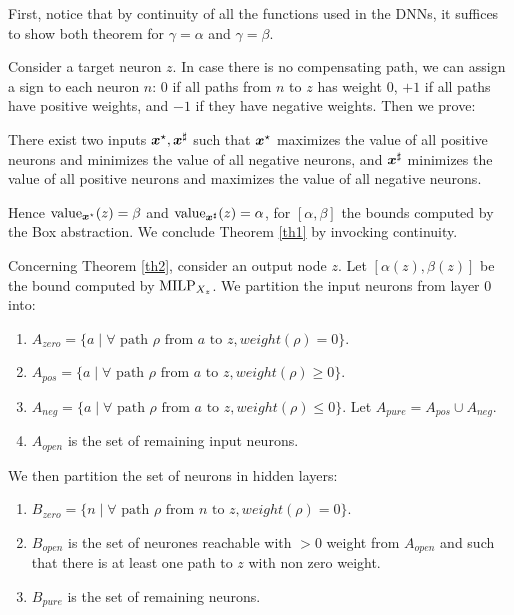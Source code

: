 First, notice that by continuity of all the functions used in the DNNs, it suffices to show both theorem for $\gamma=\alpha$ and $\gamma=\beta$.

Consider a target neuron $z$.
In case there is no compensating path, we can assign a sign to each neuron $n$: 0
if all paths from $n$ to $z$ has weight 0, $+1$ if all paths have positive weights, and 
$-1$ if they have negative weights. Then we prove:

\begin{proposition}
	\label{prop.sign}
	There exist two inputs $\boldsymbol{x}^\star,\boldsymbol{x}^\sharp$ such that ${\boldsymbol{x}^\star}$ maximizes the value of all positive neurons and minimizes the value of all negative neurons, and  ${\boldsymbol{x}^\sharp}$ minimizes the value of all positive neurons and maximizes the value of all negative neurons.
\end{proposition}

Hence ${\textrm{value}}_{\boldsymbol{x}^\star}(z)=\beta$ and ${\textrm{value}}_{\boldsymbol{x}^\sharp}(z)=\alpha$,
for $[\alpha, \beta]$ the bounds computed by the Box abstraction. We conclude Theorem \ref{th1} by invocking continuity.

\smallskip

Concerning Theorem \ref{th2}, consider an output node $z$.
Let $[\alpha(z),\beta(z)]$ be the bound computed by ${\textrm{MILP}}_{X_z}$.
We partition the input neurons from layer $0$ into:
\begin{enumerate}
	\item $A_{zero}= \{a \mid \forall \text{ path $\rho$ from $a$ to } z, weight(\rho)=0\}$.
	\item $A_{pos}= \{a \mid \forall \text{ path $\rho$ from $a$ to } z, weight(\rho)\geq0\}$.
	\item  $A_{neg}= \{a \mid \forall \text{ path $\rho$ from $a$ to } z, weight(\rho)\leq0\}$.
	Let $A_{pure}=A_{pos} \cup A_{neg}$.
	\item $A_{open}$ is the set of remaining input neurons.
\end{enumerate}

We then partition the set of neurons in hidden layers: 
\begin{enumerate}
	\item $B_{zero}= \{n \mid \forall \text{ path $\rho$ from $n$ to } z, weight(\rho)=0\}$.
	\item $B_{open}$ is the set of neurones reachable with $>0$ weight from $A_{open}$ and such that there is at least one path to $z$ with non zero weight.
	\item $B_{pure}$ is the set of remaining neurons.
\end{enumerate}

